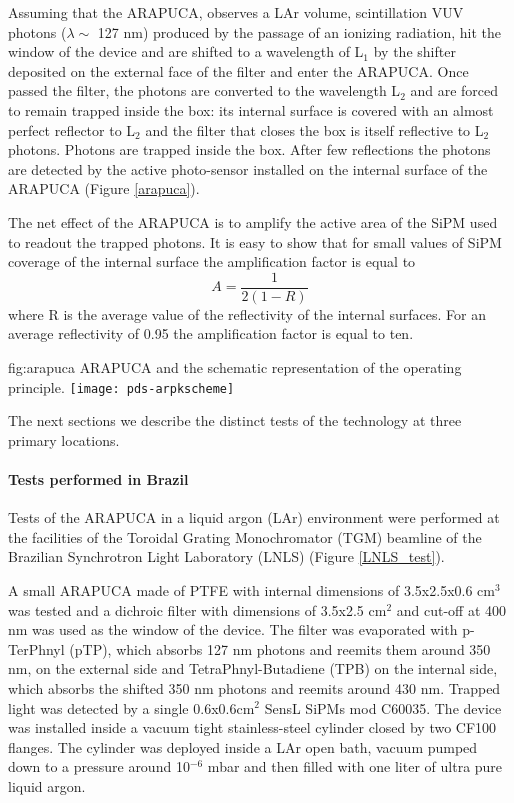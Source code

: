 Assuming that the ARAPUCA, observes a LAr volume, scintillation VUV photons ($\lambda \sim$ 127 nm) produced by the passage of an ionizing radiation, hit the window of the device and are shifted to a wavelength of L$_1$ by the shifter deposited on the external face of the filter and enter the ARAPUCA. Once passed the filter, the photons are converted to the wavelength L$_2$ and are forced to remain trapped inside the box: its internal surface is covered with an almost perfect reflector to L$_2$ and the filter that closes the box is itself reflective to L$_2$ photons. 
Photons are trapped inside the box. After few reflections the photons are detected by the active photo-sensor installed on the internal surface of the ARAPUCA (Figure \ref{arapuca}). 

The net effect of the ARAPUCA is to amplify the active area of the SiPM used to readout the trapped photons. It is easy to show that for small values of SiPM coverage of the internal surface the amplification factor is equal to
\begin{equation}
A=\frac{1}{2(1-R)}
\end{equation}
where R is the average value of the reflectivity of the internal surfaces. For an average reflectivity of 0.95 the amplification factor is equal to ten.

\begin{dunefigure}{fig:arapuca}
{ARAPUCA and the schematic representation of the operating principle.}
  \texttt{[image: pds-arpkscheme]}   
\end{dunefigure}

The next sections we describe the distinct tests of the technology at three primary locations.

\paragraph*{Tests performed in Brazil}
\label{subsec:testlnls}

Tests of the ARAPUCA in a liquid argon (LAr) environment were performed at the facilities of the Toroidal Grating Monochromator (TGM) beamline of the Brazilian Synchrotron Light Laboratory (LNLS) (Figure \ref{LNLS_test}). 

A small ARAPUCA made of PTFE with internal dimensions of 3.5x2.5x0.6 cm$^3$ was tested and a dichroic filter with dimensions of 3.5x2.5 cm$^2$ and cut-off at 400 nm was used as the window of the device.
The filter was evaporated with p-TerPhnyl (pTP), which absorbs 127 nm photons and reemits them around 350 nm,  on the external side and TetraPhnyl-Butadiene (TPB) on the internal side, which absorbs the shifted 350 nm photons and reemits around 430 nm. Trapped light was detected by a single 0.6x0.6cm$^2$  SensL SiPMs mod C60035.
The device was installed inside a vacuum tight stainless-steel cylinder closed by two CF100 flanges. The cylinder was deployed inside a LAr open bath, vacuum pumped down to a pressure around  10$^{-6}$ mbar and then filled with one liter of ultra pure liquid argon. 

